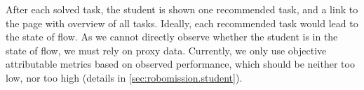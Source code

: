 After each solved task, the student is shown %
one recommended task, and a link to the page with overview of all tasks.
Ideally, each recommended task would lead to the state of flow.
As we cannot directly observe whether the student is in the state of flow,
we must rely on proxy data.
Currently, we only use objective attributable metrics based on observed performance,
which should be neither too low, nor too high
(details in \cref{sec:robomission.student}). %


